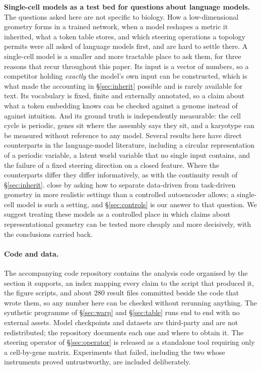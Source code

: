 \documentclass[11pt]{article}
\begin{document}
\textbf{Single-cell models as a test bed for questions about language models.} The questions asked here
are not specific to biology. How a low-dimensional geometry forms in a trained network, when a model
reshapes a metric it inherited, what a token table stores, and which steering operations a topology
permits were all asked of language models first, and are hard to settle there. A single-cell model is a
smaller and more tractable place to ask them, for three reasons that recur throughout this paper. Its
input is a vector of numbers, so a competitor holding \emph{exactly} the model's own input can be
constructed, which is what made the accounting in \S\ref{sec:inherit} possible and is rarely available
for text. Its vocabulary is fixed, finite and externally annotated, so a claim about what a token
embedding knows can be checked against a genome instead of against intuition. And its ground truth is
independently measurable: the cell cycle is periodic, genes sit where the assembly says they sit, and a
karyotype can be measured without reference to any model. Several results here have direct counterparts
in the language-model literature, including a circular representation of a periodic variable, a latent
world variable that no single input contains, and the failure of a fixed steering direction on a closed
feature. Where the counterparts differ they differ informatively, as with the continuity result of
\S\ref{sec:inherit}. \citet{prieto2026correlations} close by asking how to separate data-driven from
task-driven geometry in more realistic settings than a controlled autoencoder allows; a single-cell
model is such a setting, and \S\ref{sec:controls} is our answer to that question. We suggest treating
these models as a controlled place in which claims about representational geometry can be tested more
cheaply and more decisively, with the conclusions carried back.

\paragraph{Code and data.} The accompanying code repository contains the analysis code organised by the section it
supports, an index mapping every claim to the script that produced it, the figure scripts, and about
280 result files committed beside the code that wrote them, so any number here can be checked without
rerunning anything. The synthetic programme of \S\ref{sec:warp} and \S\ref{sec:table} runs end to
end with no external assets. Model checkpoints and datasets are third-party and are not
redistributed; the repository documents each one and where to obtain it. The steering operator of
\S\ref{sec:operator} is released as a standalone tool requiring only a cell-by-gene matrix.
Experiments that failed, including the two whose instruments proved untrustworthy, are included
deliberately.
\end{document}
